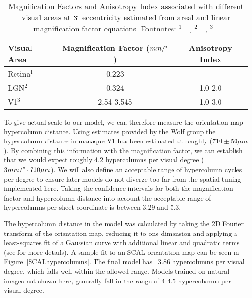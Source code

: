 \begin{table}
\centering
\begin{tabular}{l | c c}
  \hline
  \hline
  Visual Area     & Magnification Factor ($mm/\degree$) & Anisotropy Index \\
  \hline
  Retina$^1$      & 0.223                            & -                      \\
  LGN$^2$         & 0.324                             & 1.0-2.0                \\
  V1$^3$          & 2.54-3.545                       & 1.0-3.0                \\
  \hline
\end{tabular}
\caption[]%
{Magnification Factors and Anisotropy Index associated with different
  visual areas at $3\degree$ eccentricity estimated from areal and
  linear magnification factor equations. Footnotes: $^1$ -
  \cite{Perry1985}, $^2$ - \cite{Connolly1984}, $^3$ -
  \cite{VanEssen1984}}
\label{MFs}
\end{table}

To give actual scale to our model, we can therefore measure the
orientation map hypercolumn distance. Using estimates provided by the
Wolf group the hypercolumn distance in macaque V1 has been estimated
at roughly ($710 \pm 50 \mu m$). By combining this information with
the magnification factor, we can establish that we would expect
roughly 4.2 hypercolumns per visual degree ($3 mm/\degree \cdot 710
\mu m$). We will also define an acceptable range of hypercolumn cycles
per degree to ensure later models do not diverge too far from the
spatial tuning implemented here. Taking the confidence intervals for
both the magnification factor and hypercolumn distance into account
the acceptable range of hypercolumns per sheet coordinate is between
3.29 and 5.3.

The hypercolumn distance in the model was calculated by taking the 2D
Fourier transform of the orientation map, reducing it to one dimension
and applying a least-squares fit of a Gaussian curve with additional
linear and quadratic terms (see \cite{Kaschube2010} for more
details). A sample fit to an SCAL orientation map can be seen in
Figure~\ref{SCALhypercolumns}. The final model has ~3.86 hypercolumns
per visual degree, which falls well within the allowed range. Models
trained on natural images not shown here, generally fall in the range
of 4-4.5 hypercolumns per visual degree.

